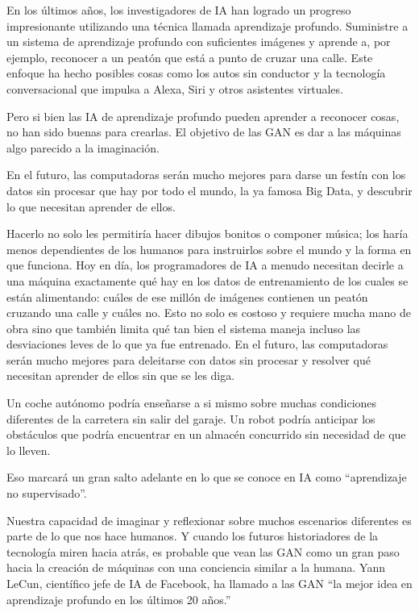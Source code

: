 \documentclass[a4paper]{article}
\begin{document}
En los últimos años, los investigadores de IA han logrado un 
progreso impresionante utilizando una técnica llamada aprendizaje 
profundo. Suministre a un
sistema de aprendizaje profundo con suficientes imágenes y aprende 
a, por ejemplo, reconocer a un peatón que está a punto de cruzar 
una calle. Este enfoque ha hecho posibles cosas como los autos sin 
conductor y la tecnología conversacional que impulsa a Alexa, Siri 
y otros asistentes virtuales.

Pero si bien las IA de aprendizaje profundo pueden aprender a 
reconocer cosas, no han sido buenas para crearlas. El objetivo de 
las GAN es dar a las máquinas algo parecido a la imaginación.

En el futuro, las computadoras serán mucho mejores para darse un 
festín con los datos sin procesar que hay por todo el mundo, la ya 
famosa Big Data, y descubrir lo que necesitan aprender de ellos.

Hacerlo no solo les permitiría hacer dibujos bonitos o componer 
música; los haría menos dependientes de los humanos
para instruirlos sobre el mundo y la forma en que funciona. Hoy en 
día, los programadores de IA a menudo necesitan decirle a una 
máquina exactamente qué hay en los datos de entrenamiento de los 
cuales se están alimentando: cuáles de ese millón de imágenes 
contienen un peatón cruzando una calle y cuáles
no. Esto no solo es costoso y requiere mucha mano de obra sino que 
también limita qué tan bien el sistema maneja incluso las 
desviaciones leves de lo que ya fue entrenado. En el futuro, las 
computadoras serán mucho mejores para deleitarse con datos sin 
procesar y resolver qué necesitan aprender de ellos sin que se les 
diga.

 Un coche autónomo podría enseñarse a si mismo sobre muchas 
 condiciones diferentes de la carretera sin salir del garaje. Un 
 robot podría anticipar los obstáculos que podría encuentrar en un 
 almacén concurrido sin necesidad de que lo lleven.

Eso marcará un gran salto adelante en lo que se conoce en IA como 
``aprendizaje no supervisado''.

Nuestra capacidad de imaginar y reflexionar sobre muchos 
escenarios diferentes es parte de lo que nos hace humanos. Y 
cuando los futuros historiadores de la tecnología miren hacia 
atrás, es probable que vean las GAN como un gran paso hacia la 
creación de máquinas con una conciencia similar a la humana. Yann 
LeCun, científico jefe de IA de Facebook, ha llamado a las GAN “la 
mejor idea en aprendizaje profundo en los últimos 20 años.” 
\end{document}
